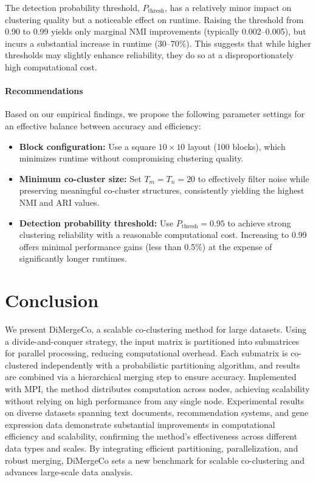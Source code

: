 \documentclass[journal]{IEEEtran}
\theoremstyle{definition}
\theoremstyle{remark} %
\begin{document}
{The detection probability threshold, $P_{\text{thresh}}$, has a relatively minor impact on clustering quality but a noticeable effect on runtime. Raising the threshold from 0.90 to 0.99 yields only marginal NMI improvements (typically 0.002--0.005), but incurs a substantial increase in runtime (30--70\%). This suggests that while higher thresholds may slightly enhance reliability, they do so at a disproportionately high computational cost.

\paragraph{Recommendations}
Based on our empirical findings, we propose the following parameter settings for an effective balance between accuracy and efficiency:
\begin{itemize}
    \item \textbf{Block configuration:} Use a square $10 \times 10$ layout (100 blocks), which minimizes runtime without compromising clustering quality.
    \item \textbf{Minimum co-cluster size:} Set $T_m = T_n = 20$ to effectively filter noise while preserving meaningful co-cluster structures, consistently yielding the highest NMI and ARI values.
    \item \textbf{Detection probability threshold:} Use $P_{\text{thresh}} = 0.95$ to achieve strong clustering reliability with a reasonable computational cost. Increasing to 0.99 offers minimal performance gains (less than 0.5\%) at the expense of significantly longer runtimes.
\end{itemize}
}

\section{Conclusion}
\label{sec:conclusion}
We present DiMergeCo, a scalable co-clustering method for large datasets. Using a divide-and-conquer strategy, the input matrix is partitioned into submatrices for parallel processing, reducing computational overhead. Each submatrix is co-clustered independently with a probabilistic partitioning algorithm, and results are combined via a hierarchical merging step to ensure accuracy. Implemented with MPI, the method distributes computation across nodes, achieving scalability without relying on high performance from any single node. {\color{blue}Experimental results on diverse datasets spanning text documents, recommendation systems, and gene expression data demonstrate substantial improvements in computational efficiency and scalability, confirming the method's effectiveness across different data types and scales.} By integrating efficient partitioning, parallelization, and robust merging, DiMergeCo sets a new benchmark for scalable co-clustering and advances large-scale data analysis.
\end{document}
